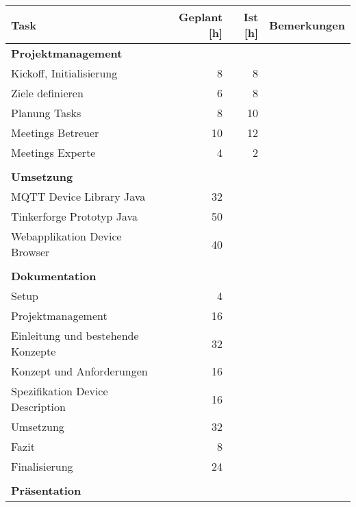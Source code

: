 \begin{table}[H]
\begin{tabularx}{\textwidth}{|l|r|r|X|}

 \hline \rowcolor{lightgray}
 {\bf Task } & { \bf Geplant [h] } & {\bf Ist [h] }  & {\bf Bemerkungen } \\  \hline
 \textbf{Projektmanagement}         &      &       &   \\ \hline
 Kickoff, Initialisierung           &   8  &   8   &   \\ \hline
 Ziele definieren                   &   6  &   8   &   \\ \hline
 Planung Tasks                      &   8  &  10   &   \\ \hline
 Meetings Betreuer                  &  10  &  12   &   \\ \hline
 Meetings Experte                   &   4  &   2   &   \\ \hline
     &      &       &   \\ \hline
 \textbf{Umsetzung}                 &      &       &   \\ \hline
 MQTT Device Library Java           &  32  &       &   \\ \hline
 Tinkerforge Prototyp Java          &  50  &       &   \\ \hline
 Webapplikation Device Browser      &  40  &       &   \\ \hline
     &      &       &   \\ \hline
 \textbf{Dokumentation}             &      &       &   \\ \hline
 Setup                              &   4  &       &   \\ \hline
 Projektmanagement                  &  16  &       &   \\ \hline
 Einleitung und bestehende Konzepte &  32  &       &   \\ \hline
 Konzept und Anforderungen          &  16  &       &   \\ \hline
 Spezifikation Device Description   &  16  &       &   \\ \hline
 Umsetzung                          &  32  &       &   \\ \hline
 Fazit                              &   8  &       &   \\ \hline
 Finalisierung                      &  24  &       &   \\ \hline
     &      &       &   \\ \hline
 \textbf{Präsentation}              &      &       &   \\ \hline

\end{tabularx}
\end{table}
